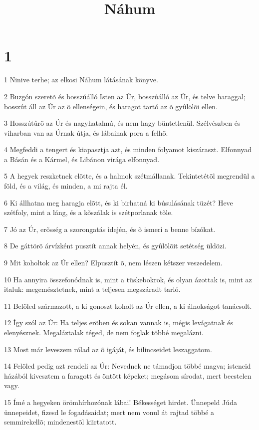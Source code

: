 

\title{Náhum}


\chapter{1}

\par 1 Ninive terhe; az elkosi Náhum látásának könyve.
\par 2 Buzgón szeretõ és bosszúálló Isten az Úr, bosszúálló az Úr, és telve haraggal; bosszút áll az Úr az õ ellenségein, és haragot tartó az õ gyûlölõi ellen.
\par 3 Hosszútûrõ az Úr és nagyhatalmú, és nem hagy büntetlenül. Szélvészben és viharban van az Úrnak útja, és lábainak pora a felhõ.
\par 4 Megfeddi a tengert és kiapasztja azt, és minden folyamot kiszáraszt. Elfonnyad a Básán és a Kármel, és Libánon virága elfonnyad.
\par 5 A hegyek reszketnek elõtte, és a halmok szétmállanak. Tekintetétõl megrendül a föld, és a világ, és minden, a mi rajta él.
\par 6 Ki állhatna meg haragja elõtt, és ki birhatná ki búsulásának tüzét? Heve szétfoly, mint a láng, és a kõszálak is szétporlanak tõle.
\par 7 Jó az Úr, erõsség a szorongatás idején,  és õ ismeri a benne bízókat.
\par 8 De gáttörõ árvízként pusztít annak helyén, és gyûlölõit setétség üldözi.
\par 9 Mit koholtok az Úr ellen? Elpusztít õ, nem lészen kétszer veszedelem.
\par 10 Ha annyira összefonódnak is, mint a tüskebokrok, és olyan ázottak is, mint az italuk: megemésztetnek, mint a teljesen megszáradt tarló.
\par 11 Belõled származott, a ki gonoszt koholt az Úr ellen, a ki álnokságot tanácsolt.
\par 12 Így szól az Úr: Ha teljes erõben és sokan vannak is, mégis levágatnak és elenyésznek. Megaláztalak téged, de nem foglak többé megalázni.
\par 13 Most már leveszem rólad az õ igáját, és bilincseidet leszaggatom.
\par 14 Felõled pedig azt rendeli az Úr: Nevednek ne támadjon többé magva; isteneid házából kivesztem a faragott és öntött képeket; megásom sírodat, mert becstelen vagy.
\par 15 Ímé a hegyeken örömhírhozónak lábai! Békességet hirdet. Ünnepeld Júda ünnepeidet, fizesd le fogadásaidat; mert nem vonul át rajtad többé a  semmirekellõ; mindenestõl kiirtatott.

